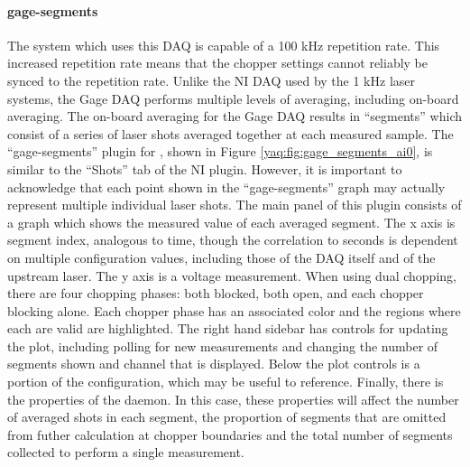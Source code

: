 \paragraph{gage-segments}

The system which uses this DAQ is capable of a 100 kHz repetition rate.
This increased repetition rate means that the chopper settings cannot reliably be synced to the repetition rate.
Unlike the NI DAQ used by the 1 kHz laser systems, the Gage DAQ performs multiple levels of averaging, including on-board averaging.
The on-board averaging for the Gage DAQ results in ``segments'' which consist of a series of laser shots averaged together at each measured sample.
The ``gage-segments'' plugin for \yaqcqtpy{}, shown in Figure \ref{yaq:fig:gage_segments_ai0}, is similar to the ``Shots'' tab of the NI plugin.
However, it is important to acknowledge that each point shown in the ``gage-segments'' graph may actually represent multiple individual laser shots.
The main panel of this plugin consists of a graph which shows the measured value of each averaged segment.
The x axis is segment index, analogous to time, though the correlation to seconds is dependent on multiple configuration values, including those of the DAQ itself and of the upstream laser.
The y axis is a voltage measurement.
When using dual chopping, there are four chopping phases: both blocked, both open, and each chopper blocking alone.
Each chopper phase has an associated color and the regions where each are valid are highlighted.
The right hand sidebar has controls for updating the plot, including polling for new measurements and changing the number of segments shown and channel that is displayed.
Below the plot controls is a portion of the configuration, which may be useful to reference.
Finally, there is the properties of the daemon.
In this case, these properties will affect the number of averaged shots in each segment, the proportion of segments that are omitted from futher calculation at chopper boundaries and the total number of segments collected to perform a single measurement.

